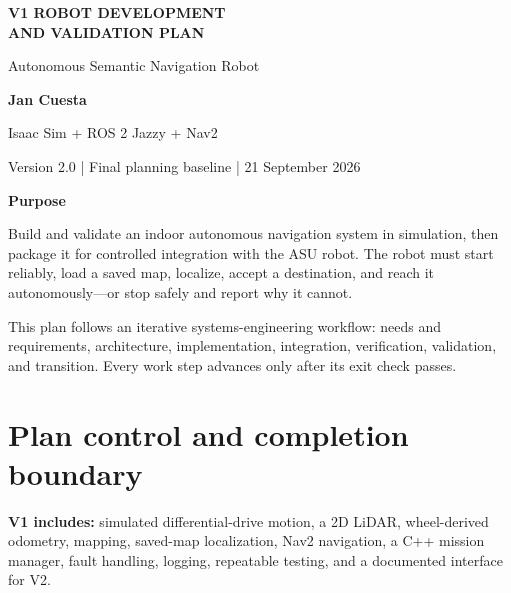 \documentclass[10pt,a4paper]{article}
\begin{document}
\begin{titlepage}
\thispagestyle{empty}

\vspace*{19mm}
{\color{white}\fontsize{27}{32}\selectfont\bfseries V1 ROBOT DEVELOPMENT\\[2mm]AND VALIDATION PLAN}\par
\vspace{3mm}
{\color{white}\Large Autonomous Semantic Navigation Robot}\par

\vspace{42mm}
{\Large\bfseries Jan Cuesta}\par
\vspace{2mm}
{\large Isaac Sim + ROS 2 Jazzy + Nav2}\par
\vspace{2mm}
{\color{Muted}Version 2.0 | Final planning baseline | 21 September 2026}\par

\vfill
\colorbox{Pale}{\parbox{0.91\textwidth}{
\textbf{Purpose}\par
Build and validate an indoor autonomous navigation system in simulation, then package it for controlled integration with the ASU robot. The robot must start reliably, load a saved map, localize, accept a destination, and reach it autonomously---or stop safely and report why it cannot.
}}

\vspace{8mm}
{\small\color{Muted}This plan follows an iterative systems-engineering workflow: needs and requirements, architecture, implementation, integration, verification, validation, and transition. Every work step advances only after its exit check passes.}
\end{titlepage}

\section{Plan control and completion boundary}

\textbf{V1 includes:} simulated differential-drive motion, a 2D LiDAR, wheel-derived odometry, mapping, saved-map localization, Nav2 navigation, a C++ mission manager, fault handling, logging, repeatable testing, and a documented interface for V2.
\end{document}
